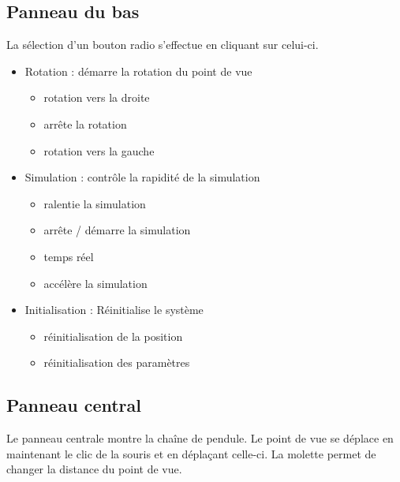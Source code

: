 \subsection{Panneau du bas}
%
La sélection d'un bouton radio s'effectue en cliquant sur celui-ci. 
%
%
\begin{itemize}[leftmargin=1cm, label=, itemsep=0pt]
	\item Rotation : démarre la rotation du point de vue
	\begin{itemize}[leftmargin=1cm, label=, itemsep=0pt]
		\item rotation vers la droite
		\item arrête la rotation
		\item rotation vers la gauche
	\end{itemize}
	\item Simulation : contrôle la rapidité de la simulation
	\begin{itemize}[leftmargin=1cm, label=, itemsep=0pt]
		\item ralentie la simulation
		\item arrête / démarre la simulation
		\item temps réel
		\item accélère la simulation
	\end{itemize}
	\item Initialisation : Réinitialise le système
	\begin{itemize}[leftmargin=1cm, label=, itemsep=0pt]
		\item réinitialisation de la position
		\item réinitialisation des paramètres
	\end{itemize}
\end{itemize}
%
\subsection{Panneau central}
%
Le panneau centrale montre la chaîne de pendule. Le point de vue se déplace en maintenant le clic de la souris et en déplaçant celle-ci. La molette permet de changer la distance du point de vue.
%
%
